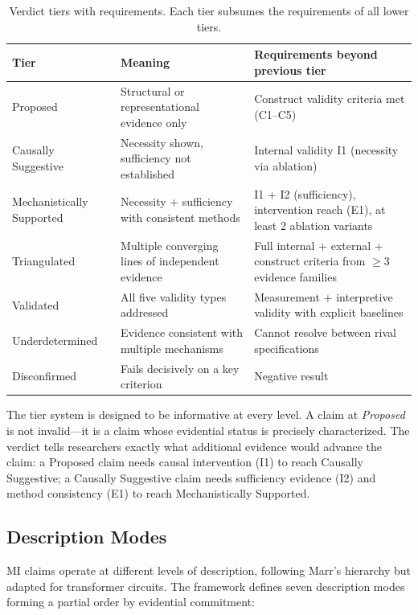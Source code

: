\documentclass[10pt]{article}
\newcommand{\tighttable}{\setlength{\tabcolsep}{4pt}\renewcommand{\arraystretch}{1.05}}
\begin{document}
\begin{table}[t]
\centering
\tighttable
\caption{Verdict tiers with requirements. Each tier subsumes the requirements of all lower tiers.}
\label{tab:verdicts}
\small
\begin{tabular}{@{}lp{4.5cm}p{5.5cm}@{}}
\toprule
\textbf{Tier} & \textbf{Meaning} & \textbf{Requirements beyond previous tier} \\
\midrule
Proposed & Structural or representational evidence only & Construct validity criteria met (C1--C5) \\
Causally Suggestive & Necessity shown, sufficiency not established & Internal validity I1 (necessity via ablation) \\
Mechanistically Supported & Necessity + sufficiency with consistent methods & I1 + I2 (sufficiency), intervention reach (E1), at least 2 ablation variants \\
Triangulated & Multiple converging lines of independent evidence & Full internal + external + construct criteria from $\geq 3$ evidence families \\
Validated & All five validity types addressed & Measurement + interpretive validity with explicit baselines \\
\midrule
Underdetermined & Evidence consistent with multiple mechanisms & Cannot resolve between rival specifications \\
Disconfirmed & Fails decisively on a key criterion & Negative result \\
\bottomrule
\end{tabular}
\end{table}

The tier system is designed to be informative at every level. A claim at \emph{Proposed} is not invalid---it is a claim whose evidential status is precisely characterized. The verdict tells researchers exactly what additional evidence would advance the claim: a Proposed claim needs causal intervention (I1) to reach Causally Suggestive; a Causally Suggestive claim needs sufficiency evidence (I2) and method consistency (E1) to reach Mechanistically Supported.

\subsection{Description Modes}
\label{sec:description-modes}

MI claims operate at different levels of description, following Marr's hierarchy but adapted for transformer circuits. The framework defines seven description modes forming a partial order by evidential commitment:
\end{document}
